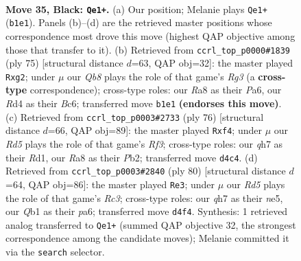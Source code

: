 \documentclass[11pt]{article}
\begin{document}
\clearpage

\begin{figure}[p]\centering
\begin{subfigure}{0.46\textwidth}\centering
\resizebox{\linewidth}{!}{%
\newchessgame
\chessboard[
  setfen={r7/p6Q/2k1p3/p2p4/3r2P1/2bR4/2P1K3/1q6 b - - 3 35},
  showmover=false,
  pgfstyle=straightmove, color=movearrow, markmove={b1-e1}
]}
\caption{}
\end{subfigure}\hfill
\begin{subfigure}{0.46\textwidth}\centering
\resizebox{\linewidth}{!}{%
\newchessgame
\chessboard[
  setfen={8/7k/p1bQp1rp/4n3/p7/4P3/6P1/R6K b - - 2 38},
  showmover=false,
  pgfstyle=straightmove, color=movearrow, markmove={g6-g2}
]}
\caption{}
\end{subfigure}
\\[4pt]
\begin{subfigure}{0.46\textwidth}\centering
\resizebox{\linewidth}{!}{%
\newchessgame
\chessboard[
  setfen={3r2k1/1p6/p2P2pb/P7/5rB1/5R2/1P3P1P/3R3K w - - 5 39},
  showmover=false,
  pgfstyle=straightmove, color=movearrow, markmove={f3-f4}
]}
\caption{}
\end{subfigure}\hfill
\begin{subfigure}{0.46\textwidth}\centering
\resizebox{\linewidth}{!}{%
\newchessgame
\chessboard[
  setfen={6k1/8/p2Pp3/1p2n1p1/1Br5/P1R5/6P1/5K2 w - - 0 41},
  showmover=false,
  pgfstyle=straightmove, color=movearrow, markmove={c3-e3}
]}
\caption{}
\end{subfigure}
\caption{\textbf{Move 35, Black: \texttt{Qe1+}.} (a) Our position; Melanie plays \texttt{Qe1+} (\texttt{b1e1}). Panels (b)--(d) are the retrieved master positions whose correspondence most drove this move (highest QAP objective among those that transfer to it). (b) Retrieved from \texttt{ccrl\_top\_p0000\#1839} (ply 75) [structural distance $d$=63, QAP obj=32]: the master played \texttt{Rxg2}; under $\mu$ our \emph{Qb8} plays the role of that game's \emph{Rg3} (a \textbf{cross-type} correspondence); cross-type roles: our \emph{R}a8 as their \emph{P}a6, our \emph{R}d4 as their \emph{B}c6; transferred move \texttt{b1e1} \textbf{(endorses this move)}. (c) Retrieved from \texttt{ccrl\_top\_p0003\#2733} (ply 76) [structural distance $d$=66, QAP obj=89]: the master played \texttt{Rxf4}; under $\mu$ our \emph{Rd5} plays the role of that game's \emph{Rf3}; cross-type roles: our \emph{q}h7 as their \emph{R}d1, our \emph{R}a8 as their \emph{P}b2; transferred move \texttt{d4c4}. (d) Retrieved from \texttt{ccrl\_top\_p0003\#2840} (ply 80) [structural distance $d$=64, QAP obj=86]: the master played \texttt{Re3}; under $\mu$ our \emph{Rd5} plays the role of that game's \emph{Rc3}; cross-type roles: our \emph{q}h7 as their \emph{n}e5, our \emph{Q}b1 as their \emph{p}a6; transferred move \texttt{d4f4}. Synthesis: 1 retrieved analog transferred to \texttt{Qe1+} (summed QAP objective 32, the strongest correspondence among the candidate moves); Melanie committed it via the \texttt{search} selector.}
\label{fig:thought-m69}
\end{figure}
\end{document}
